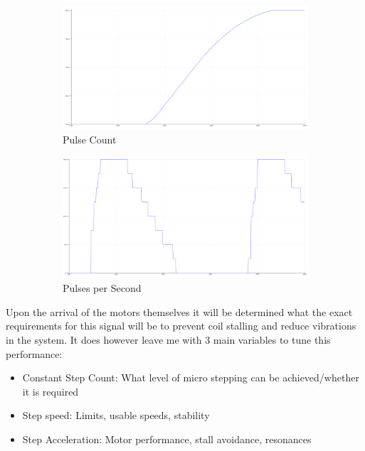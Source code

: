 \begin{figure}[h]
    \centering
    \begin{subfigure}{.45\textwidth}
      \centering
      \includegraphics[width=\linewidth]{img/stepper_pulses.PNG}
      \caption{Pulse Count}
    \end{subfigure}%
    \begin{subfigure}{.45\textwidth}
      \centering
      \includegraphics[width=\linewidth]{img/stepper_pulse_acc.PNG}
      \caption{Pulses per Second}
    \end{subfigure}
    \caption{}
    \label{fig:code}
  \end{figure}

  Upon the arrival of the motors themselves it will be determined what the exact requirements for this signal will be to prevent coil stalling and reduce vibrations in the system. It does however leave me with 3 main variables to tune this performance:
  \begin{itemize}
      \item Constant Step Count: What level of micro stepping can be achieved/whether it is required 
      \item Step speed: Limits, usable speeds, stability
      \item Step Acceleration: Motor performance, stall avoidance, resonances
  \end{itemize} 
